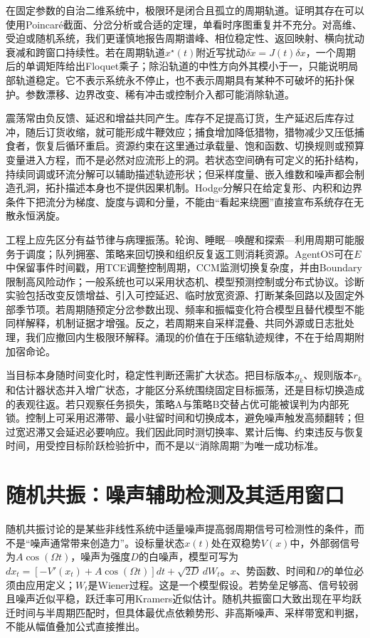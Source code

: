 在固定参数的自治二维系统中，极限环是闭合且孤立的周期轨道。证明其存在可以使用Poincar\'{e}截面、分岔分析或合适的定理，单看时序图重复并不充分。对高维、受迫或随机系统，我们更谨慎地报告周期谱峰、相位稳定性、返回映射、横向扰动衰减和跨窗口持续性。若在周期轨道$x^\star(t)$附近写扰动$\delta\dot x=J(t)\delta x$，一个周期后的单调矩阵给出Floquet乘子；除沿轨道的中性方向外其模小于一，只能说明局部轨道稳定。它不表示系统永不停止，也不表示周期具有某种不可破坏的拓扑保护。参数漂移、边界改变、稀有冲击或控制介入都可能消除轨道。

震荡常由负反馈、延迟和增益共同产生。库存不足提高订货，生产延迟后库存过冲，随后订货收缩，就可能形成牛鞭效应；捕食增加降低猎物，猎物减少又压低捕食者，恢复后循环重启。资源约束在这里通过承载量、饱和函数、切换规则或预算变量进入方程，而不是必然对应流形上的洞。若状态空间确有可定义的拓扑结构，持续同调或环流分解可以辅助描述轨迹形状；但采样度量、嵌入维数和噪声都会制造孔洞，拓扑描述本身也不提供因果机制。Hodge分解只在给定复形、内积和边界条件下把流分为梯度、旋度与调和分量，不能由“看起来绕圈”直接宣布系统存在无散永恒涡旋。

工程上应先区分有益节律与病理振荡。轮询、睡眠—唤醒和探索—利用周期可能服务于调度；队列拥塞、策略来回切换和组织反复返工则消耗资源。AgentOS可在$E$中保留事件时间戳，用TCE调整控制周期，CCM监测切换复杂度，并由Boundary限制高风险动作；一般系统也可以采用状态机、模型预测控制或分布式协议。诊断实验包括改变反馈增益、引入可控延迟、临时放宽资源、打断某条回路以及固定外部季节项。若周期随预定分岔参数出现、频率和振幅变化符合模型且替代模型不能同样解释，机制证据才增强。反之，若周期来自采样混叠、共同外源或日志批处理，我们应撤回内生极限环解释。涌现的价值在于压缩轨迹规律，不在于给周期附加宿命论。

当目标本身随时间变化时，稳定性判断还需扩大状态。把目标版本$g_k$、规则版本$r_k$和估计器状态并入增广状态，才能区分系统围绕固定目标振荡，还是目标切换造成的表观往返。若只观察任务损失，策略A与策略B交替占优可能被误判为内部死锁。控制上可采用迟滞带、最小驻留时间和切换成本，避免噪声触发高频翻转；但过宽迟滞又会延迟必要响应。我们因此同时测切换率、累计后悔、约束违反与恢复时间，用受控目标阶跃检验折中，而不是以“消除周期”为唯一成功标准。

\section{随机共振：噪声辅助检测及其适用窗口}
\label{sec:emergence_resonance}

随机共振讨论的是某些非线性系统中适量噪声提高弱周期信号可检测性的条件，而不是“噪声通常带来创造力”。设标量状态$x(t)$处在双稳势$V(x)$中，外部弱信号为$A\cos(\Omega t)$，噪声为强度$D$的白噪声，模型可写为$dx_t=[-V'(x_t)+A\cos(\Omega t)]dt+\sqrt{2D}\,dW_t$。$x$、势函数、时间和$D$的单位必须由应用定义；$W_t$是Wiener过程。这是一个模型假设。若势垒足够高、信号较弱且噪声近似平稳，跃迁率可用Kramers近似估计。随机共振窗口大致出现在平均跃迁时间与半周期匹配时，但具体最优点依赖势形、非高斯噪声、采样带宽和判据，不能从幅值叠加公式直接推出。

